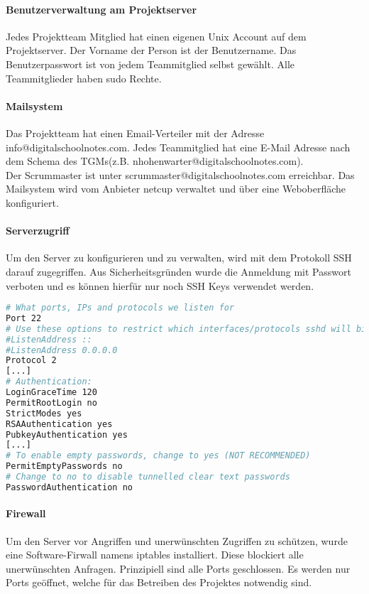 \paragraph{Benutzerverwaltung am Projektserver}
Jedes Projektteam Mitglied hat einen eigenen Unix Account auf dem Projektserver. Der Vorname der Person ist der Benutzername. Das Benutzerpasswort ist von jedem Teammitglied selbst gewählt. Alle Teammitglieder haben sudo Rechte. 

\paragraph{Mailsystem}
Das Projektteam hat einen Email-Verteiler mit der Adresse info@digitalschoolnotes.com. Jedes Teammitglied hat eine E-Mail Adresse nach dem Schema des \gls{TGM}s(z.B. nhohenwarter@digitalschoolnotes.com). \\
Der Scrummaster ist unter scrummaster@digitalschoolnotes.com erreichbar. Das Mailsystem wird vom Anbieter netcup verwaltet und über eine Weboberfläche konfiguriert.

\paragraph{Serverzugriff}
Um den Server zu konfigurieren und zu verwalten, wird mit dem Protokoll \gls{SSH} darauf zugegriffen. Aus Sicherheitsgründen wurde die Anmeldung mit Passwort verboten und es können hierfür nur noch SSH Keys verwendet werden.
\begin{lstlisting}[caption = Auszug der SSH Server Konfiguration, label = ssh1, language=bash] 
# What ports, IPs and protocols we listen for
Port 22
# Use these options to restrict which interfaces/protocols sshd will bind to
#ListenAddress ::
#ListenAddress 0.0.0.0
Protocol 2
[...]
# Authentication:
LoginGraceTime 120
PermitRootLogin no
StrictModes yes
RSAAuthentication yes
PubkeyAuthentication yes
[...]
# To enable empty passwords, change to yes (NOT RECOMMENDED)
PermitEmptyPasswords no
# Change to no to disable tunnelled clear text passwords
PasswordAuthentication no
\end{lstlisting}

\paragraph{Firewall}
Um den Server vor Angriffen und unerwünschten Zugriffen zu schützen, wurde eine Software-Firwall namens iptables installiert. Diese blockiert alle unerwünschten Anfragen. Prinzipiell sind alle Ports geschlossen. Es werden nur Ports geöffnet, welche für das Betreiben des Projektes notwendig sind.

